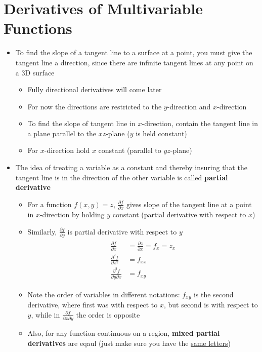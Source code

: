 \documentclass{article}
\begin{document}
\section{Derivatives of Multivariable Functions}
\begin{itemize}
  \item To find the slope of a tangent line to a surface at a point, you must give the tangent line a direction, since there are infinite tangent lines at any point on a 3D surface
  \begin{itemize}
    \item Fully directional derivatives will come later
    \item For now the directions are restricted to the $y$-direction and $x$-direction
    \item To find the slope of tangent line in $x$-direction, contain the tangent line in a plane parallel to the $xz$-plane ($y$ is held constant)
    \item For $x$-direction hold $x$ constant (parallel to $yz$-plane)
  \end{itemize}
  \item The idea of treating a variable as a constant and thereby insuring that the tangent line is in the direction of the other variable is called \textbf{partial derivative}
  \begin{itemize}
    \item For a function $f(x,y) = z$, $\frac{\partial f}{\partial x}$ gives slope of the tangent line at a point in $x$-direction by holding $y$ constant (partial derivative with respect to $x$)
    \item Similarly, $\frac{\partial f}{\partial y}$ is partial derivative with respect to $y$
    \begin{align}
      \begin{split}
        \frac{\partial f}{\partial x} &= \frac{\partial z}{\partial x} = f_x = z_x \\
        \frac{\partial^2 f}{\partial x^2} &= f_{xx} \\
        \frac{\partial^2 f}{\partial y \partial x} &= f_{xy}
      \end{split}
    \end{align}
    \item Note the order of variables in different notations: $f_{xy}$ is the second derivative, where first was with respect to $x$, but second is with respect to $y$, while in $\frac{\partial f}{\partial x \partial y}$ the order is opposite
    \item Also, for any function continuous on a region, \textbf{mixed partial derivatives} are eqaul (just make sure you have the \underline{same letters})

\end{itemize}
\end{itemize}
\end{document}
